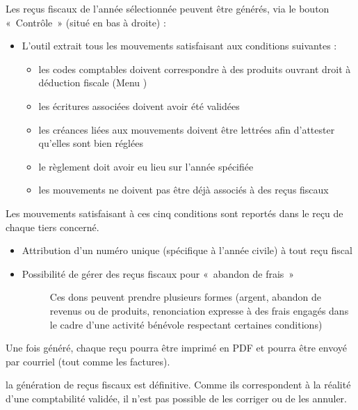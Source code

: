 \documentclass[a4paper,10pt,oneside,french]{sphinxmanual}
\begin{document}
Les reçus fiscaux de l’année sélectionnée peuvent être générés, via le bouton « Contrôle » (situé en bas à droite) :
\begin{itemize}
\item {} 
L’outil extrait tous les mouvements satisfaisant aux conditions suivantes :
\begin{itemize}
\item {} 
les codes comptables doivent correspondre à des produits ouvrant droit à déduction fiscale (Menu )

\item {} 
les écritures associées doivent avoir été validées

\item {} 
les créances liées aux mouvements doivent être lettrées afin d’attester qu’elles sont bien réglées

\item {} 
le règlement doit avoir eu lieu sur l’année spécifiée

\item {} 
les mouvements ne doivent pas être déjà associés à des reçus fiscaux

\end{itemize}

\end{itemize}

Les mouvements satisfaisant à ces cinq conditions sont reportés dans le reçu de chaque tiers concerné.
\begin{itemize}
\item {} 
Attribution d’un numéro unique (spécifique à l’année civile) à tout reçu fiscal

\item {} \begin{description}
\item[{Possibilité de gérer des reçus fiscaux pour « abandon de frais »}] \leavevmode
Ces dons peuvent prendre plusieurs formes (argent, abandon de revenus ou de produits, renonciation expresse à des frais engagés dans le cadre d’une activité bénévole respectant certaines conditions)

\end{description}

\end{itemize}

Une fois généré, chaque reçu pourra être imprimé en PDF et pourra être envoyé par courriel (tout comme les factures).

 la génération de reçus fiscaux est définitive. Comme ils correspondent à la réalité d’une comptabilité validée, il n’est pas possible de les corriger ou de les annuler.
\end{document}
